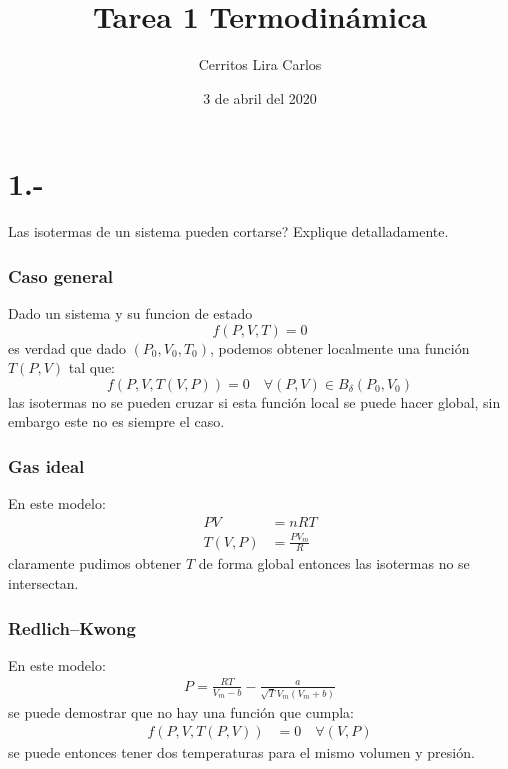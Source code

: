 \documentclass{article}
\title{Tarea 1 Termodinámica}
\author{Cerritos Lira Carlos}
\date{3 de abril del 2020}
\begin{document}
\maketitle
\section*{1.-}
Las isotermas de un sistema pueden cortarse? Explique detalladamente.
\begin{tcolorbox}[breakable]
    \subsubsection*{Caso general}
    Dado un sistema  y su funcion de estado 
    \[ f(P,V,T) = 0 \]
    es verdad que dado $(P_0,V_0,T_0)$, podemos obtener localmente una función 
    $T(P,V)$ tal que:
    \[ f(P,V,T(V,P)) = 0 \quad \forall (P,V) \in B_{\delta}(P_0,V_0) \] 
    las isotermas no se pueden cruzar si esta función local se puede 
    hacer global, sin embargo este no es siempre el caso.
    \subsubsection*{Gas ideal}
    En este modelo:
    \begin{align*}
        PV &= nRT \\
        T(V,P) &= \frac{PV_m}{R}   
    \end{align*}
    claramente pudimos obtener $T$ de forma global entonces las isotermas no se intersectan.

    \subsubsection*{Redlich–Kwong}  
    En este modelo:
    \begin{align*}
        P = \frac{RT}{V_m-b} - \frac{a}{\sqrt{T}V_m(V_m+b)}
    \end{align*}
    se puede demostrar que no hay una función que cumpla:
    \begin{align*}
        f(P,V,T(P,V)) &= 0 \quad \forall (V,P)
    \end{align*}
    se puede entonces tener dos temperaturas para el mismo volumen y presión. 
\end{tcolorbox}
\end{document}
